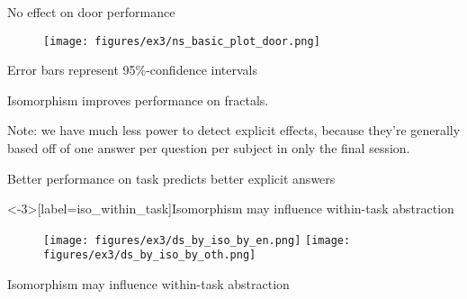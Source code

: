 \documentclass{beamer}
\begin{document}
\begin{frame}{No effect on door performance}
\begin{figure}
\centering
\texttt{[image: figures/ex3/ns\_basic\_plot\_door.png]}
\end{figure}
{\scriptsize Error bars represent 95\%-confidence intervals}
\end{frame}

\begin{frame}[standout]
Isomorphism improves performance on fractals.
\end{frame}


\begin{frame}
Note: we have much less power to detect explicit effects, because they're generally based off of one answer per question per subject in only the final session.
\end{frame}

\begin{frame}{Better performance on task predicts better explicit answers}
\begin{figure}
\centering
{} 
\end{figure}
\end{frame}


\begin{frame}<-3>[label=iso_within_task]{Isomorphism may influence within-task abstraction}
\begin{figure}
\centering
{}   {
    \texttt{[image: figures/ex3/ds\_by\_iso\_by\_en.png]}
}  {
    \texttt{[image: figures/ex3/ds\_by\_iso\_by\_oth.png]}
}

\end{figure}
\end{frame}

\begin{frame}{Isomorphism may influence within-task abstraction}
\begin{figure}
\centering
{} 
\end{figure}
\end{frame}
\end{document}
